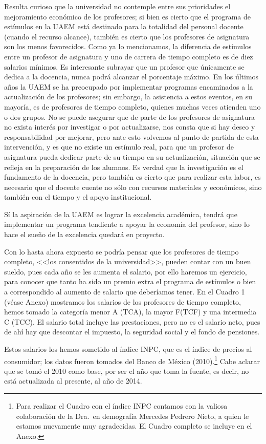 Resulta curioso que la universidad no contemple entre sus prioridades el
mejoramiento económico de los profesores; si bien es cierto que el programa
de estímulos en la UAEM está destinado para la totalidad del personal
docente (cuando el recurso alcance), también es cierto que los profesores
de asignatura son los menos favorecidos. Como ya lo mencionamos, la
diferencia de estímulos entre un profesor de asignatura y uno de carrera de
tiempo completo es de diez salarios mínimos. Es interesante
subrayar que un profesor que únicamente se dedica a la docencia, nunca
podrá alcanzar el porcentaje máximo. En los últimos años la UAEM
 se ha preocupado por implementar programas encaminados a la actualización
de los profesores; sin embargo, la asistencia a estos eventos, en su
mayoría, es de profesores de tiempo completo, quienes  muchas veces
atienden uno o dos grupos. No se puede asegurar que de parte de los
profesores de asignatura no exista interés por investigar o por
actualizarse, nos consta que si hay deseo y responsabilidad por mejorar,
pero ante esto volvemos al punto de partida de esta intervención, y es que
no existe un estímulo real, para que un profesor de asignatura pueda
dedicar parte de su tiempo en su actualización, situación que se refleja en
la preparación de los alumnos. Es verdad que la investigación es el
fundamento de la docencia, pero también es cierto que para realizar esta
labor, es necesario que el docente cuente no sólo con recursos materiales y
económicos, sino también con el tiempo y el apoyo institucional. 


Sí la aspiración de la UAEM es lograr la excelencia académica, tendrá que
implementar un programa tendiente a apoyar la economía del profesor, sino
lo hace el sueño de la excelencia quedará en proyecto.


Con lo hasta ahora expuesto se podría pensar que los profesores de tiempo
completo, <<los consentidos de la universidad>>, pueden contar con un buen
sueldo, pues cada año se les aumenta el salario, por  ello haremos un
ejercicio, para conocer que tanto ha sido un premio extra el programa de
estímulos o bien a correspondido al aumento de salario que deberíamos
tener. En el Cuadro 1 (véase Anexo) mostramos los salarios de los
profesores de tiempo completo, hemos tomado la categoría menor  A (TCA), 
la mayor F(TCF)  y una intermedia C (TCC). El salario total incluye las
prestaciones, pero no es el salario neto, pues de ahí hay que descontar el
impuesto, la seguridad social y el fondo de pensiones.


Estos salarios los hemos sometido al índice INPC, que es el índice de
precios al consumidor; los datos fueron tomados del Banco de México
(2010).\footnote{Para realizar el Cuadro con
el índice INPC contamos con la valiosa colaboración de la Dra.\ en
demografía Mercedes Pedrero Nieto, a quien le estamos nuevamente  muy
agradecidas. El Cuadro completo se incluye en el Anexo.} Cabe aclarar que
se tomó el 2010 como base, por ser el año que toma la fuente, es decir, no
está actualizada al presente, al año de 2014. 


